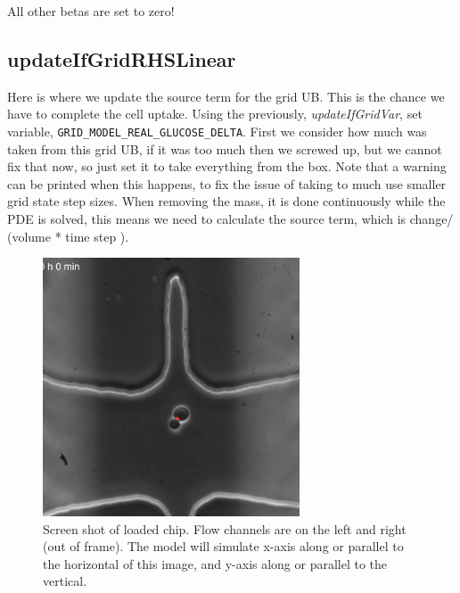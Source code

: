 \documentclass{article}
\begin{document}
All other betas are set to zero!

\subsection{updateIfGridRHSLinear}
Here is where we update the source term for the grid UB.
This is the chance we have to complete the cell uptake.
Using the previously, \textit{updateIfGridVar}, set variable, \texttt{GRID\_MODEL\_REAL\_GLUCOSE\_DELTA}.  
First we consider how much was taken from this grid UB, 
if it was too much then we screwed up, but we cannot fix that now,
so just set it to take everything from the box.
Note that a warning can be printed when this happens, 
to fix the issue of taking to much use smaller grid state step sizes.
When removing the mass, it is done continuously while the PDE is solved,
this means we need to calculate the source term, which is change/ (volume * time step ).





\begin{figure}
\begin{center}
\includegraphics[natwidth=3in,natheight=3.5in,width=3in]{figs/chip.png}
\caption{Screen shot of loaded chip.  
Flow channels are on the left and right (out of frame).
The model will simulate x-axis along or parallel to the horizontal of this image, 
and y-axis along or parallel to the vertical.}
\label{FIG:chip}
\end{center}
\end{figure}









\end{document}
